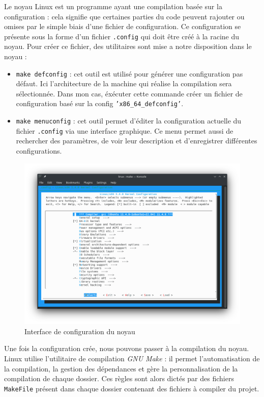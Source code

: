 Le noyau Linux est un programme ayant une compilation basée sur la configuration : cela signifie que certaines parties du code peuvent rajouter ou omises par le simple biais d'une fichier de configuration. Ce configuration se présente sous la forme d'un fichier \texttt{.config} qui doit être créé à la racine du noyau. Pour créer ce fichier, des utilitaires sont mise a notre disposition dans le noyau :
\begin{itemize}
    \item \texttt{make defconfig} : cet outil est utilisé pour générer une configuration pas défaut. Ici l'architecture de la machine qui réalise la compilation sera sélectionnée. Dans mon cas, éxécuter cette commande créer un fichier de configuration basé sur la config \texttt{'x86\_64\_defconfig'}.
    \item \texttt{make menuconfig} : cet outil permet d'éditer la configuration actuelle du fichier \texttt{.config} via une interface graphique. Ce menu permet aussi de rechercher des paramètres, de voir leur description et d'enregistrer différentes configurations.
\end{itemize}

\begin{figure}[H]
    \centering
    \includegraphics[width=0.65\paperwidth]{Images/make menuconfig.png}
    \caption{Interface de configuration du noyau}
\end{figure}

Une fois la configuration crée, nous pouvons passer à la compilation du noyau. Linux utilise l'utilitaire de compilation \textit{GNU Make} : il permet l'automatisation de la compilation, la gestion des dépendances et gère la personnalisation de la compilation de chaque dossier. Ces règles sont alors dictés par des fichiers \texttt{MakeFile} présent dans chaque dossier contenant des fichiers à compiler du projet.

